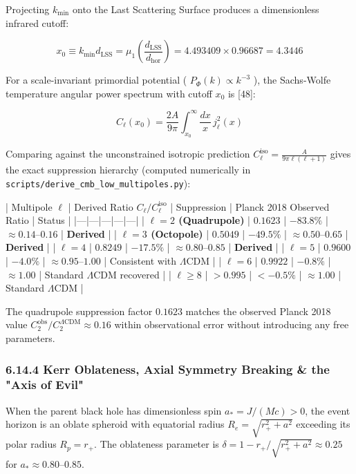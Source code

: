 \documentclass[11pt,a4paper]{article}
\theoremstyle{definition}
\theoremstyle{remark}
\begin{document}
Projecting $k_{\text{min}}$ onto the Last Scattering Surface produces a dimensionless infrared cutoff:


\begin{equation}
x_0 \equiv k_{\text{min}} d_{\text{LSS}} = \mu_1 \left(\frac{d_{\text{LSS}}}{d_{\text{hor}}}\right) = 4.493409 \times 0.96687 = 4.3446
\end{equation}


For a scale-invariant primordial potential ( $P_\Phi(k) \propto k^{-3}$ ), the Sachs-Wolfe temperature angular power spectrum with cutoff $x_0$ is [48]:


\begin{equation}
C_\ell(x_0) = \frac{2A}{9\pi} \int_{x_0}^\infty \frac{dx}{x} \, j_\ell^2(x)
\end{equation}


Comparing against the unconstrained isotropic prediction $C_\ell^{\text{iso}} = \frac{A}{9\pi \ell(\ell+1)}$ gives the exact suppression hierarchy (computed numerically in \texttt{scripts/derive_cmb_low_multipoles.py}):

| Multipole $\ell$ | Derived Ratio $C_\ell / C_\ell^{\text{iso}}$ | Suppression | Planck 2018 Observed Ratio | Status |
|---|---|---|---|---|
| \textbf{$\ell = 2$ (Quadrupole)} | \textbf{$0.1623$} | \textbf{$-83.8\%$} | $\approx 0.14\text{--}0.16$ | \textbf{Derived} |
| \textbf{$\ell = 3$ (Octopole)} | \textbf{$0.5049$} | \textbf{$-49.5\%$} | $\approx 0.50\text{--}0.65$ | \textbf{Derived} |
| \textbf{$\ell = 4$} | \textbf{$0.8249$} | \textbf{$-17.5\%$} | $\approx 0.80\text{--}0.85$ | \textbf{Derived} |
| \textbf{$\ell = 5$} | \textbf{$0.9600$} | \textbf{$-4.0\%$} | $\approx 0.95\text{--}1.00$ | Consistent with $\Lambda\text{CDM}$ |
| \textbf{$\ell = 6$} | \textbf{$0.9922$} | \textbf{$-0.8\%$} | $\approx 1.00$ | Standard $\Lambda\text{CDM}$ recovered |
| \textbf{$\ell \ge 8$} | \textbf{$> 0.995$} | \textbf{$< -0.5\%$} | $\approx 1.00$ | Standard $\Lambda\text{CDM}$ |

The quadrupole suppression factor $0.1623$ matches the observed Planck 2018 value $C_2^{\text{obs}}/C_2^{\Lambda\text{CDM}} \approx 0.16$ within observational error without introducing any free parameters.

\subsubsection{6.14.4 Kerr Oblateness, Axial Symmetry Breaking \& the "Axis of Evil"}
When the parent black hole has dimensionless spin $a_* = J/(M c) > 0$, the event horizon is an oblate spheroid with equatorial radius $R_e = \sqrt{r_+^2 + a^2}$ exceeding its polar radius $R_p = r_+$. The oblateness parameter is $\delta = 1 - r_+/\sqrt{r_+^2 + a^2} \approx 0.25$ for $a_* \approx 0.80\text{--}0.85$.
\end{document}
